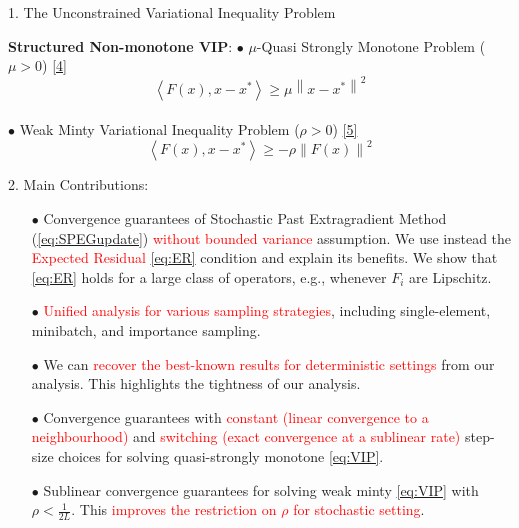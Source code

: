 \documentclass[24pt,final]{beamer}
\newlength{\onecolwid}
\begin{document}
\begin{frame}[t]
\begin{columns}[t]
\begin{column}{\onecolwid}
\begin{block}{1. The Unconstrained Variational Inequality Problem}
\begin{alertblock}{\textbf{Structured Non-monotone VIP}:}
	$\bullet$ $\mu$-Quasi Strongly Monotone Problem ($\mu > 0$) \href{https://arxiv.org/pdf/2107.00052.pdf}{[4]}
\begin{equation*}
    \left \langle F(x), x - x^* \right \rangle \geq \mu \left \| x - x^* \right \|^2
\end{equation*}\\
$\bullet$ Weak Minty Variational Inequality Problem ($\rho > 0$) \href{https://proceedings.mlr.press/v130/diakonikolas21a/diakonikolas21a.pdf}{[5]}
\begin{equation*}
    \left \langle F(x), x - x^* \right \rangle \geq -\rho \left\|F(x)\right \|^2
\end{equation*}
\end{alertblock}

\end{block}

\begin{block}{2. Main Contributions:}
    \begin{alertblock}{}
	\begin{enumerate}[]
    \item[$\bullet$] Convergence guarantees of Stochastic Past Extragradient Method (\ref{eq:SPEGupdate}) \textcolor{red}{without bounded variance} assumption. We use instead the \textcolor{red}{Expected Residual} \eqref{eq:ER} condition and explain its benefits. %
    We show that \ref{eq:ER} holds for a large class of operators, e.g., whenever $F_i$ are Lipschitz.

    \item[$\bullet$] \textcolor{red}{Unified analysis for various sampling strategies}, including single-element, minibatch, and importance sampling.

    \item[$\bullet$] We can \textcolor{red}{recover the best-known results for deterministic settings} from our analysis. This highlights the tightness of our analysis.

    \item[$\bullet$] Convergence guarantees with \textcolor{red}{constant (linear convergence to a neighbourhood)} and \textcolor{red}{switching (exact convergence at a sublinear rate)} step-size choices for solving quasi-strongly monotone \ref{eq:VIP}. 

    \item[$\bullet$] Sublinear convergence guarantees for solving weak minty \ref{eq:VIP} with $\rho < \frac{1}{2L}$. This \textcolor{red}{improves the restriction on $\rho$ for stochastic setting}. 
    \end{enumerate}
\end{alertblock}
\end{block}


\end{column}
\end{columns}
\end{frame}
\end{document}
